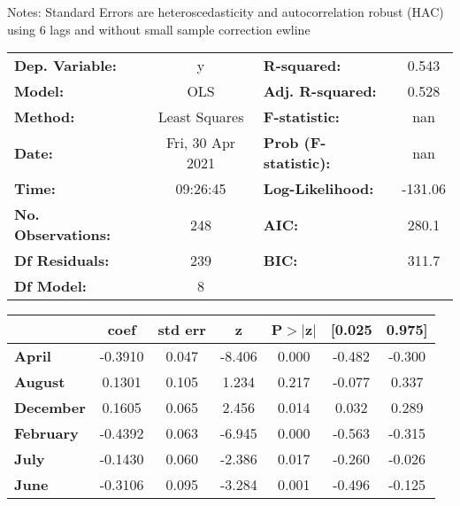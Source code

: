 Notes: \newline
 [1] Standard Errors are heteroscedasticity and autocorrelation robust (HAC) using 6 lags and without small sample correction
ewline\begin{center}
\begin{tabular}{lclc}
\toprule
\textbf{Dep. Variable:}    &        y         & \textbf{  R-squared:         } &     0.543   \\
\textbf{Model:}            &       OLS        & \textbf{  Adj. R-squared:    } &     0.528   \\
\textbf{Method:}           &  Least Squares   & \textbf{  F-statistic:       } &       nan   \\
\textbf{Date:}             & Fri, 30 Apr 2021 & \textbf{  Prob (F-statistic):} &      nan    \\
\textbf{Time:}             &     09:26:45     & \textbf{  Log-Likelihood:    } &   -131.06   \\
\textbf{No. Observations:} &         248      & \textbf{  AIC:               } &     280.1   \\
\textbf{Df Residuals:}     &         239      & \textbf{  BIC:               } &     311.7   \\
\textbf{Df Model:}         &           8      & \textbf{                     } &             \\
\bottomrule
\end{tabular}
\begin{tabular}{lcccccc}
                  & \textbf{coef} & \textbf{std err} & \textbf{z} & \textbf{P$> |$z$|$} & \textbf{[0.025} & \textbf{0.975]}  \\
\midrule
\textbf{April}    &      -0.3910  &        0.047     &    -8.406  &         0.000        &       -0.482    &       -0.300     \\
\textbf{August}   &       0.1301  &        0.105     &     1.234  &         0.217        &       -0.077    &        0.337     \\
\textbf{December} &       0.1605  &        0.065     &     2.456  &         0.014        &        0.032    &        0.289     \\
\textbf{February} &      -0.4392  &        0.063     &    -6.945  &         0.000        &       -0.563    &       -0.315     \\
\textbf{July}     &      -0.1430  &        0.060     &    -2.386  &         0.017        &       -0.260    &       -0.026     \\
\textbf{June}     &      -0.3106  &        0.095     &    -3.284  &         0.001        &       -0.496    &       -0.125     \\

\end{tabular}
\end{center}
